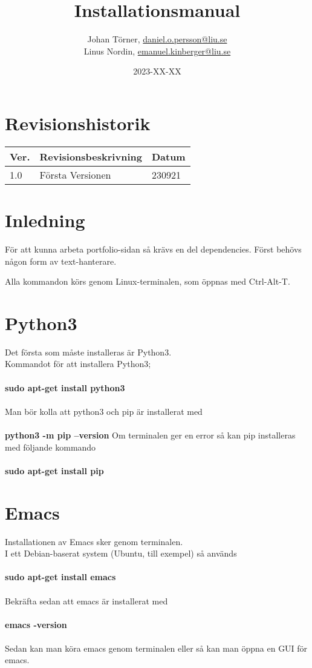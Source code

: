 \documentclass{TDP003mall}
\author{Johan Törner, \url{daniel.o.persson@liu.se}\\
  Linus Nordin, \url{emanuel.kinberger@liu.se}\\}
\title{Installationsmanual}
\date{2023-XX-XX}
\begin{document}
\projectpage
\section{Revisionshistorik}
\begin{table}[!h]
\begin{tabularx}{\linewidth}{|l|X|l|}
\hline
Ver. & Revisionsbeskrivning & Datum \\\hline
1.0 & Första Versionen & 230921 \\\hline
\end{tabularx}
\end{table}


\section{Inledning}
För att kunna arbeta portfolio-sidan så krävs en del dependencies.
Först behövs någon form av text-hanterare.

Alla kommandon körs genom Linux-terminalen, som öppnas med Ctrl-Alt-T.

\section{Python3}
Det första som måste installeras är Python3.\\ 
Kommandot för att installera Python3;\\\\
\textbf{sudo apt-get install python3}\\\\
Man bör kolla att python3 och pip är installerat med\\\\
\textbf{python3 -m pip --version}
Om terminalen ger en error så kan pip installeras med följande kommando\\\\
\textbf{sudo apt-get install pip}

\section{Emacs}
Installationen av Emacs sker genom terminalen.\\
I ett Debian-baserat system (Ubuntu, till exempel) så används\\\\
\textbf{sudo apt-get install emacs}\\\\
Bekräfta sedan att emacs är installerat med\\\\
\textbf{emacs -version}\\\\
Sedan kan man köra emacs genom terminalen eller så kan man öppna en GUI för emacs.
\end{document}
